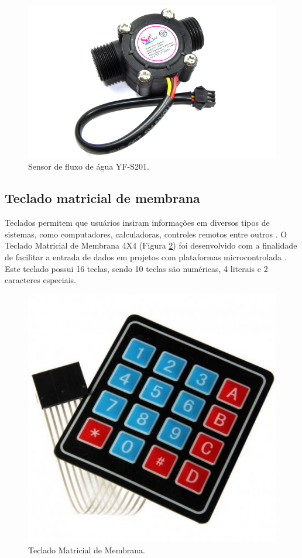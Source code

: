\begin{figure}[htbp]
		\centering
		\includegraphics[scale=0.3]{figuras/yf-s201.jpg}
		\caption{Sensor de fluxo de água YF-S201.}
		\label{fig:sensor}
\end{figure}

\newpage

\subsection{Teclado matricial de membrana} \label{sec:teclado}

Teclados permitem que usuários insiram informações em diversos tipos de sistemas, como computadores, calculadoras, controles remotos entre outros \cite{teclado-matricial-1}. O Teclado Matricial de Membrana 4X4 (Figura \ref{fig:teclado}) foi desenvolvido com a finalidade de facilitar a entrada de dados em projetos com plataformas microcontrolada \cite{teclado-matricial}. Este teclado possui 16 teclas, sendo 10 teclas são numéricas, 4 literais e 2 caracteres especiais.

\begin{figure}[htbp]
	\centering
	\includegraphics[scale=0.2]{figuras/teclado-matricial.jpg}
	\caption{Teclado Matricial de Membrana.}
	\label{fig:teclado}
\end{figure}

